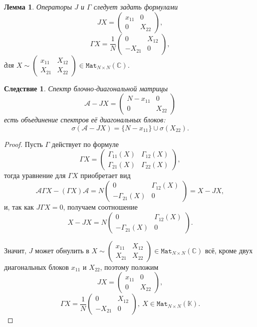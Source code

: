 \documentclass[14pt,a4paper]{extarticle}
\newtheorem{lem}{Лемма}
\newtheorem{crl}{Следствие}
\theoremstyle{definition}
\begin{document}
\begin{lem}
    Операторы \( J \) и \( \Gamma \)
    следует задать формулами
    \[
        J X = \begin{pmatrix} x_{11} & 0 \\ 0 & X_{22} \end{pmatrix}, \]
    \[
        \Gamma X = \frac{1}{N} \begin{pmatrix} 0 & X_{12} \\ -X_{21} & 0 \end{pmatrix}, \]
        для \( X\sim \begin{pmatrix}x_{11} & X_{12} \\ X_{21} & X_{22}\end{pmatrix} \in \mathtt{Mat}_{N{\times}N}(\mathbb{C}) \).

\end{lem}
\begin{crl}
    Спектр блочно-диагональной матрицы
    \[ \mathcal{A} - JX = \begin{pmatrix} N - x_{11} & 0 \\ 0 & X_{22} \end{pmatrix} \]
    есть объединение спектров е\"е диагональных блоков:
    \[
        \sigma(\mathcal{A} - J X) = \{ N - x_{11} \} \cup \sigma(X_{22}). \]
\end{crl}
\begin{proof}
Пусть \( \Gamma \) действует по формуле
\[ \Gamma X = \begin{pmatrix} \Gamma_{11}(X) & \Gamma_{12}(X) \\
                              \Gamma_{21}(X) & \Gamma_{22}(X)
                            \end{pmatrix}, \]
тогда уравнение для \( \Gamma X \) приобретает вид
    \[
        \mathcal{A} \Gamma X - (\Gamma X)\mathcal{A} =
        N
        \begin{pmatrix}
          0 & \Gamma_{12}(X) \\
          -\Gamma_{21}(X) & 0
        \end{pmatrix} = X - JX,
     \]
     и, так как \( J\Gamma X = 0 \), получаем соотношение
\[
    X - J X =
    N \begin{pmatrix} 0 & \Gamma_{12}(X) \\
        - \Gamma_{21}(X) & 0
        \end{pmatrix}. \]

Значит, \( J \) может обнулить в
    \( X \sim
    \begin{pmatrix}
    x_{11} & X_{12} \\
    X_{21} & X_{22}
    \end{pmatrix} \in \mathtt{Mat}_{N{\times}N}(\mathbb{C}) \)
    вс\"е, кроме двух диагональных блоков \( x_{11} \) и \( X_{22} \),
    поэтому положим
\[
    J X = \begin{pmatrix} x_{11} & 0 \\ 0 & X_{22} \end{pmatrix}, \]
\[
    \Gamma X = \frac{1}{N} \begin{pmatrix} 0 & X_{12} \\ -X_{21} &
      0 \end{pmatrix},\ X\in\mathtt{Mat}_{N{\times}N}(\mathbb{K}). 
\]
\end{proof}
\end{document}
